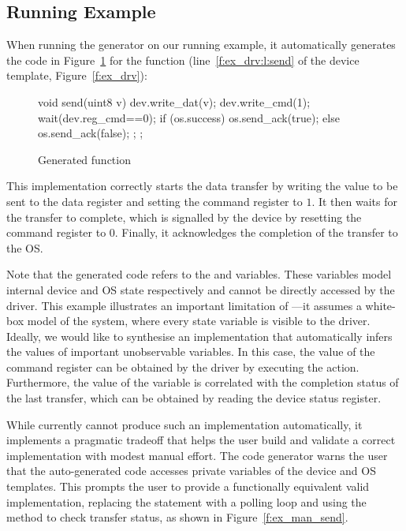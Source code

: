 \subsection{Running Example}

When running the generator on our running example, it automatically generates the code in Figure~\ref{f:ex_gen_send} for the  function (line~\ref{f:ex_drv:l:send} of the device template, Figure~\ref{f:ex_drv}):

\begin{figure}
\begin{tsllisting}
void send(uint8 v){
    dev.write_dat(v);
    dev.write_cmd(1);
    wait(dev.reg_cmd==0);
    if (os.success) {
        os.send_ack(true);
    } else {
        os.send_ack(false);
    };
};
\end{tsllisting}
\caption{Generated  function}
\label{f:ex_gen_send}
\end{figure}

This implementation correctly starts the data transfer by writing the value to be sent to the data register and setting the command register to $1$.  It then waits for the transfer to complete, which is signalled by the device by resetting the command register to $0$.  Finally, it acknowledges the completion of the transfer to the OS.

Note that the generated code refers to the  and  variables.  These variables model internal device and OS state respectively and cannot be directly accessed by the driver.  This example illustrates an important limitation of \termite---it assumes a white-box model of the system, where every state variable is visible to the driver.  Ideally, we would like to synthesise an implementation that automatically infers the values of important unobservable variables.  In this case, the value of the command register can be obtained by the driver by executing the  action.  Furthermore, the value of the  variable is correlated with the completion status of the last transfer, which can be obtained by reading the device status register.

While \termite currently cannot produce such an implementation automatically, it implements a pragmatic tradeoff that helps the user build and validate a correct implementation with modest manual effort.  The code generator warns the user that the auto-generated code accesses  private variables of the device and OS templates.  This prompts the user to provide a functionally equivalent valid implementation, replacing the  statement with a polling loop and using the  method to check transfer status, as shown in Figure~\ref{f:ex_man_send}.

